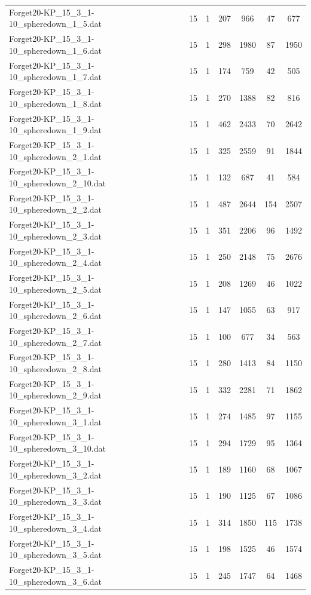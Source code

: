 \begin{table}[!ht]
\begin{tabular}{lcccccc}
Forget20-KP\_15\_3\_1-10\_spheredown\_1\_5.dat & 15 & 1 & 207 & 966 & 47 & 677 \\
Forget20-KP\_15\_3\_1-10\_spheredown\_1\_6.dat & 15 & 1 & 298 & 1980 & 87 & 1950 \\
Forget20-KP\_15\_3\_1-10\_spheredown\_1\_7.dat & 15 & 1 & 174 & 759 & 42 & 505 \\
Forget20-KP\_15\_3\_1-10\_spheredown\_1\_8.dat & 15 & 1 & 270 & 1388 & 82 & 816 \\
Forget20-KP\_15\_3\_1-10\_spheredown\_1\_9.dat & 15 & 1 & 462 & 2433 & 70 & 2642 \\
Forget20-KP\_15\_3\_1-10\_spheredown\_2\_1.dat & 15 & 1 & 325 & 2559 & 91 & 1844 \\
Forget20-KP\_15\_3\_1-10\_spheredown\_2\_10.dat & 15 & 1 & 132 & 687 & 41 & 584 \\
Forget20-KP\_15\_3\_1-10\_spheredown\_2\_2.dat & 15 & 1 & 487 & 2644 & 154 & 2507 \\
Forget20-KP\_15\_3\_1-10\_spheredown\_2\_3.dat & 15 & 1 & 351 & 2206 & 96 & 1492 \\
Forget20-KP\_15\_3\_1-10\_spheredown\_2\_4.dat & 15 & 1 & 250 & 2148 & 75 & 2676 \\
Forget20-KP\_15\_3\_1-10\_spheredown\_2\_5.dat & 15 & 1 & 208 & 1269 & 46 & 1022 \\
Forget20-KP\_15\_3\_1-10\_spheredown\_2\_6.dat & 15 & 1 & 147 & 1055 & 63 & 917 \\
Forget20-KP\_15\_3\_1-10\_spheredown\_2\_7.dat & 15 & 1 & 100 & 677 & 34 & 563 \\
Forget20-KP\_15\_3\_1-10\_spheredown\_2\_8.dat & 15 & 1 & 280 & 1413 & 84 & 1150 \\
Forget20-KP\_15\_3\_1-10\_spheredown\_2\_9.dat & 15 & 1 & 332 & 2281 & 71 & 1862 \\
Forget20-KP\_15\_3\_1-10\_spheredown\_3\_1.dat & 15 & 1 & 274 & 1485 & 97 & 1155 \\
Forget20-KP\_15\_3\_1-10\_spheredown\_3\_10.dat & 15 & 1 & 294 & 1729 & 95 & 1364 \\
Forget20-KP\_15\_3\_1-10\_spheredown\_3\_2.dat & 15 & 1 & 189 & 1160 & 68 & 1067 \\
Forget20-KP\_15\_3\_1-10\_spheredown\_3\_3.dat & 15 & 1 & 190 & 1125 & 67 & 1086 \\
Forget20-KP\_15\_3\_1-10\_spheredown\_3\_4.dat & 15 & 1 & 314 & 1850 & 115 & 1738 \\
Forget20-KP\_15\_3\_1-10\_spheredown\_3\_5.dat & 15 & 1 & 198 & 1525 & 46 & 1574 \\
Forget20-KP\_15\_3\_1-10\_spheredown\_3\_6.dat & 15 & 1 & 245 & 1747 & 64 & 1468 \\

\end{tabular}
\end{table}
